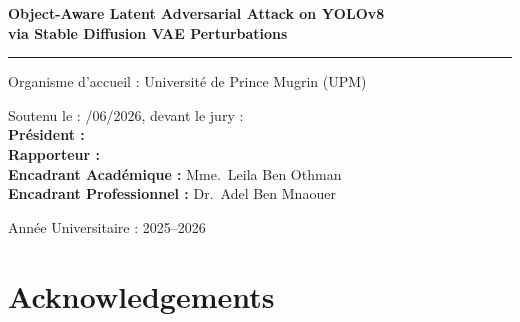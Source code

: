 \documentclass[12pt,a4paper]{report}
\begin{document}
\begin{titlepage}
    \vspace{0.6\baselineskip}

    {\Large \textbf{Object-Aware Latent Adversarial Attack on YOLOv8\\[4pt]
    via Stable Diffusion VAE Perturbations}}

    \vspace{0.6\baselineskip}

    {\color{black}\rule{\textwidth}{1.8pt}}

    \vspace{0.7\baselineskip}

    {\large Organisme d'accueil : Université de Prince Mugrin (UPM)}

    \vspace{0.3cm}

    \begin{flushleft}
        {\normalsize Soutenu le : \phantom{00}/06/2026,
         devant le jury :}\\[4pt]
        {\normalsize \textbf{Président :}}\\
        {\normalsize \textbf{Rapporteur :}}\\
        {\normalsize \textbf{Encadrant Académique :} Mme.~Leila Ben Othman}\\
        {\normalsize \textbf{Encadrant Professionnel :} Dr.~Adel Ben Mnaouer}
    \end{flushleft}

    \vfill

    \fbox{%
      \begin{minipage}{170pt}
        \centering
        \vspace{8pt}
        {\Large GLSI -- 3CSI}
        \vspace{8pt}
      \end{minipage}%
    }

    \vspace{0.5cm}

    {\large Année Universitaire : 2025--2026}

\end{titlepage}

\setcounter{page}{1}

\chapter*{Acknowledgements}
\end{document}
